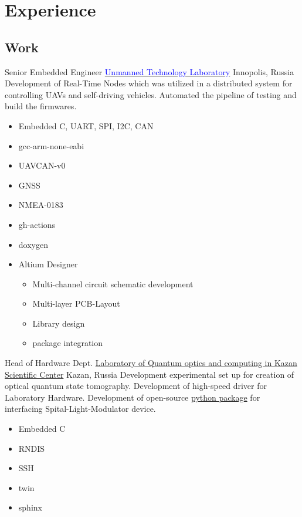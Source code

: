 \section{Experience}

\vspace{2mm}
\subsection{\Large{Work}}

        {Senior Embedded Engineer}
        {\href{https://robotics.innopolis.university/en/labs/laboratoriya-bespilotnyh-technologyi/}{\textcolor{blue}{Unmanned Technology Laboratory}}}
        {Innopolis, Russia}
        {
        \newline
        Development of Real-Time Nodes which was utilized in a distributed system for controlling UAVs and self-driving vehicles. Automated the pipeline of testing and build the firmwares.
        } 
        {
        \begin{itemize}
            \item Embedded C, UART, SPI, I2C, CAN
            \item gcc-arm-none-eabi
            \item UAVCAN-v0
            \item GNSS
                \item NMEA-0183
            \item gh-actions
            \item doxygen
            \item Altium Designer \begin{itemize}
                \item Multi-channel circuit schematic development
                \item Multi-layer PCB-Layout
                \item Library design
                \item package integration
            \end{itemize}
        \end{itemize}
        }
        {Head of Hardware Dept.}
        {\href{http://kfti.knc.ru/}{\color{blue}Laboratory of Quantum optics and  computing  in  Kazan Scientific Center}}
        {Kazan, Russia}
        {
        \newline
        Development experimental set up for creation of optical quantum state tomography. 
        Development of high-speed driver for Laboratory Hardware.
        Development of open-source \href{https://pypi.org/project/holoeye-embedded/}{\color{blue}python package} for interfacing Spital-Light-Modulator device.    
        } 
        {
        \begin{itemize}
            \item Embedded C
            \item RNDIS
            \item SSH
            \item twin
            \item sphinx
        \end{itemize}
        }



